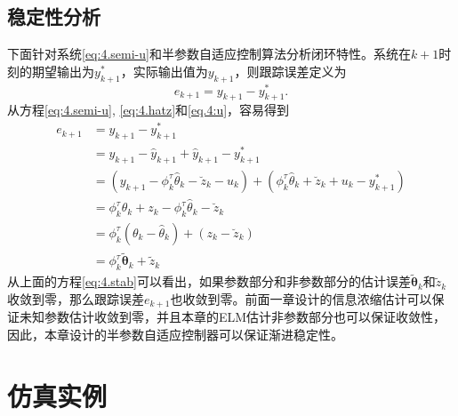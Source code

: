 \subsection{稳定性分析}\label{sect:4.3.2}
下面针对系统\ref{eq:4.semi-u}和半参数自适应控制算法分析闭环特性。系统在$k+1$时刻的期望输出为$y^{*}_{k+1}$，实际输出值为$y_{k+1}$，则跟踪误差定义为
\begin{equation}
e_{k+1} = y_{k+1} - y^{*}_{k+1}.
\end{equation}
从方程\eqref{eq:4.semi-u}, \eqref{eq:4.hatz}和\eqref{eq.4:u}，容易得到
\begin{equation}\label{eq:4.stab}
\begin{split}%
e_{k+1} & = y_{k+1} - y^{*}_{k+1}\\
& = y_{k+1} - \hat{y}_{k+1} + \hat{y}_{k+1} - y^{*}_{k+1}\\
& = (y_{k+1} - \phi_{k}^{\tau}\hat{\theta}_{k} - \breve{z}_{k} - u_{k} )+(\phi_{k}^{\tau}\hat{\theta}_{k} + \breve{z}_{k} + u_{k}  - y^{*}_{k+1})\\
& = \phi_{k}^{\tau}\theta_{k} + z_{k} - \phi_{k}^{\tau}\hat{\theta}_{k} - \breve{z}_{k}\\
& = \phi_{k}^{\tau}(\theta_{k} - \hat{\theta}_{k}) + (z_{k} - \breve{z}_{k})\\
& = \phi_{k}^{\tau}\tilde{\bm{\theta}}_{k}+\tilde{z}_{k}
\end{split}
\end{equation}
从上面的方程\eqref{eq:4.stab}可以看出，如果参数部分和非参数部分的估计误差$\tilde{\bm{\theta}}_{k}$和$\tilde{z}_{k}$收敛到零，那么跟踪误差$e_{k+1}$也收敛到零。前面一章设计的信息浓缩估计可以保证未知参数估计收敛到零，并且本章的ELM估计非参数部分也可以保证收敛性，因此，本章设计的半参数自适应控制器可以保证渐进稳定性。

\section{仿真实例}\label{sect:4.4}

